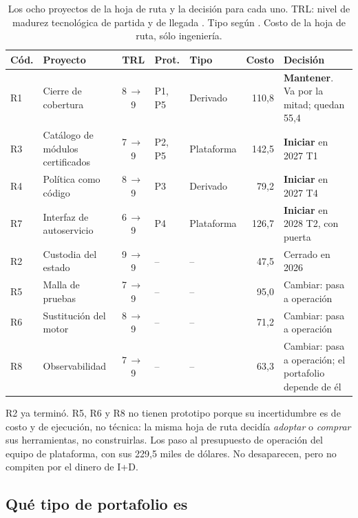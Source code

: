 \documentclass[11pt,letterpaper]{article}
\begin{document}
\begin{table}[H]
\centering
\footnotesize
\setlength{\tabcolsep}{3.5pt}
\caption{Los ocho proyectos de la hoja de ruta y la decisión para cada uno. TRL:
nivel de madurez tecnológica de partida y de llegada \autocite{mankins1995}.
Tipo según \textcite{wheelwright1992}. Costo de la hoja de ruta, sólo
ingeniería.}
\label{tab:seleccion}
\begin{tabularx}{\textwidth}{@{}l>{\raggedright\arraybackslash}p{3.3cm}cl>{\raggedright\arraybackslash}p{1.5cm}r>{\raggedright\arraybackslash}X@{}}
\toprule
\textbf{Cód.} & \textbf{Proyecto} & \textbf{TRL} & \textbf{Prot.} &
  \textbf{Tipo} & \textbf{Costo} & \textbf{Decisión} \\
\midrule
R1 & Cierre de cobertura & 8\,$\to$\,9 & P1, P5 & Derivado & 110,8 &
  \textbf{Mantener}. Va por la mitad; quedan 55,4 \\
R3 & Catálogo de módulos certificados & 7\,$\to$\,9 & P2, P5 & Plataforma &
  142,5 & \textbf{Iniciar} en 2027 T1 \\
R4 & Política como código & 8\,$\to$\,9 & P3 & Derivado & 79,2 &
  \textbf{Iniciar} en 2027 T4 \\
R7 & Interfaz de autoservicio & 6\,$\to$\,9 & P4 & Plataforma & 126,7 &
  \textbf{Iniciar} en 2028 T2, con puerta \\
\midrule
R2 & Custodia del estado & 9\,$\to$\,9 & -- & -- & 47,5 & Cerrado en 2026 \\
R5 & Malla de pruebas & 7\,$\to$\,9 & -- & -- & 95,0 & Cambiar: pasa a
  operación \\
R6 & Sustitución del motor & 8\,$\to$\,9 & -- & -- & 71,2 & Cambiar: pasa a
  operación \\
R8 & Observabilidad & 7\,$\to$\,9 & -- & -- & 63,3 & Cambiar: pasa a
  operación; el portafolio depende de él \\
\bottomrule
\end{tabularx}
\end{table}

R2 ya terminó. R5, R6 y R8 no tienen prototipo porque su incertidumbre es de
costo y de ejecución, no técnica: la misma hoja de ruta decidía \emph{adoptar}
o \emph{comprar} sus herramientas, no construirlas. Los paso al presupuesto de
operación del equipo de plataforma, con sus 229,5 miles de dólares. No
desaparecen, pero no compiten por el dinero de I+D.

\subsection*{Qué tipo de portafolio es}
\end{document}
